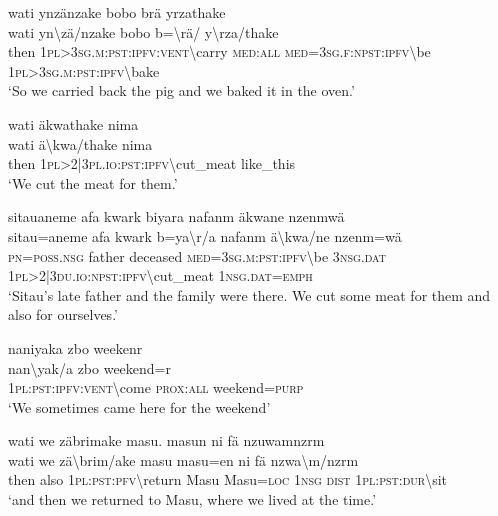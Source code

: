 \ea\label{ex:12:a809}
wati ynzänzake bobo brä yrzathake\\
\gll wati	yn{\textbackslash}zä/nzake	bobo	b={\textbackslash}rä/	y{\textbackslash}rza/thake\\
     then	1\textsc{pl}>3\textsc{sg}.\textsc{m}:\textsc{pst}:\textsc{ipfv}:\textsc{vent}{\textbackslash}carry	\textsc{med}:\textsc{all}	\textsc{med}=3\textsc{sg}.\textsc{f}:\textsc{npst}:\textsc{ipfv}{\textbackslash}be	1\textsc{pl}>3\textsc{sg}.\textsc{m}:\textsc{pst}:\textsc{ipfv}{\textbackslash}bake\\
\glt `So we carried back the pig and we baked it in the oven.'
\z

\ea\label{ex:12:a811}
wati äkwathake nima\\
\gll wati	ä{\textbackslash}kwa/thake	nima\\
     then	1\textsc{pl}>2|3\textsc{pl}.\textsc{io}:\textsc{pst}:\textsc{ipfv}{\textbackslash}cut\_meat	like\_this\\
\glt `We cut the meat for them.'
\z

\ea\label{ex:12:a812}
sitauaneme afa kwark biyara nafanm äkwane nzenmwä\\
\gll sitau=aneme	afa	kwark	b=ya{\textbackslash}r/a	nafanm	ä{\textbackslash}kwa/ne	nzenm=wä\\
     \textsc{pn}=\textsc{poss}.\textsc{nsg}	father	deceased	\textsc{med}=3\textsc{sg}.\textsc{m}:\textsc{pst}:\textsc{ipfv}{\textbackslash}be	3\textsc{nsg}.\textsc{dat}	1\textsc{pl}>2|3\textsc{du}.\textsc{io}:\textsc{npst}:\textsc{ipfv}{\textbackslash}cut\_meat	1\textsc{nsg}.\textsc{dat}=\textsc{emph}\\
\glt `Sitau's late father and the family were there. We cut some meat for them and also for ourselves.'
\z

\ea\label{ex:12:a814}
naniyaka zbo weekenr\\
\gll nan{\textbackslash}yak/a	zbo	weekend=r\\
     1\textsc{pl}:\textsc{pst}:\textsc{ipfv}:\textsc{vent}{\textbackslash}come	\textsc{prox}:\textsc{all}	weekend=\textsc{purp}\\
\glt `We sometimes came here for the weekend'
\z

\ea\label{ex:12:a816}
wati we zäbrimake masu. masun ni fä nzuwamnzrm\\
\gll wati	we	zä{\textbackslash}brim/ake	masu	masu=en	ni	fä	nzwa{\textbackslash}m/nzrm\\
     then	also	1\textsc{pl}:\textsc{pst}:\textsc{pfv}{\textbackslash}return	Masu	Masu=\textsc{loc}	1\textsc{nsg}	\textsc{dist}	1\textsc{pl}:\textsc{pst}:\textsc{dur}{\textbackslash}sit\\
\glt `and then we returned to Masu, where we lived at the time.'
\z

